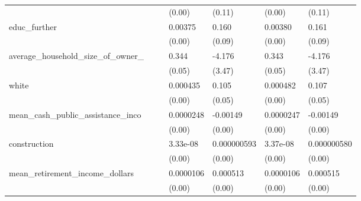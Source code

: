 {\begin{longtable}{|l|ll|ll|ll|}
                        &                     &                     &      (0.00)         &      (0.11)         &      (0.00)         &      (0.11)         \\
            [1em]
            educ\_further&                     &                     &     0.00375\sym{**} &       0.160         &     0.00380\sym{**} &       0.161         \\
                        &                     &                     &      (0.00)         &      (0.09)         &      (0.00)         &      (0.09)         \\
            [1em]
            average\_household\_size\_of\_owner\_&                     &                     &       0.344\sym{***}&      -4.176         &       0.343\sym{***}&      -4.176         \\
                        &                     &                     &      (0.05)         &      (3.47)         &      (0.05)         &      (3.47)         \\
            [1em]
            white       &                     &                     &    0.000435         &       0.105\sym{*}  &    0.000482         &       0.107\sym{*}  \\
                        &                     &                     &      (0.00)         &      (0.05)         &      (0.00)         &      (0.05)         \\
            [1em]
            mean\_cash\_public\_assistance\_inco&                     &                     &   0.0000248\sym{***}&    -0.00149\sym{***}&   0.0000247\sym{***}&    -0.00149\sym{***}\\
                        &                     &                     &      (0.00)         &      (0.00)         &      (0.00)         &      (0.00)         \\
            [1em]
            construction&                     &                     &    3.33e-08\sym{*}  & 0.000000593         &    3.37e-08\sym{*}  & 0.000000580         \\
                        &                     &                     &      (0.00)         &      (0.00)         &      (0.00)         &      (0.00)         \\
            [1em]
            mean\_retirement\_income\_dollars&                     &                     &   0.0000106\sym{***}&    0.000513\sym{***}&   0.0000106\sym{***}&    0.000515\sym{***}\\
                        &                     &                     &      (0.00)         &      (0.00)         &      (0.00)         &      (0.00)         \\

\end{longtable}}

